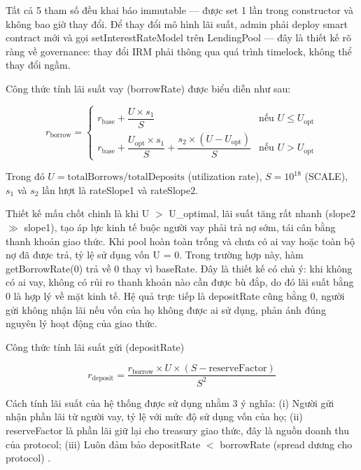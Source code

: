 \documentclass[../DoAn.tex]{subfiles}
\begin{document}
Tất cả 5 tham số đều khai báo immutable --- được set 1 lần trong constructor và không bao giờ thay đổi. Để thay đổi mô hình lãi suất, admin phải deploy smart contract mới và gọi setInterestRateModel trên LendingPool --- đây là thiết kế rõ ràng về governance: thay đổi IRM phải thông qua quá trình timelock, không thể thay đổi ngầm.

Công thức tính lãi suất vay (borrowRate) được biểu diễn như sau:

\begin{equation}
r_{\mathrm{borrow}} = \begin{cases}
r_{\mathrm{base}} + \dfrac{U \times s_1}{S} & \text{nếu } U \leq U_{\mathrm{opt}} \\[8pt]
r_{\mathrm{base}} + \dfrac{U_{\mathrm{opt}} \times s_1}{S} + \dfrac{s_2 \times (U - U_{\mathrm{opt}})}{S} & \text{nếu } U > U_{\mathrm{opt}}
\end{cases}
\label{eq:borrow_rate}
\end{equation}

Trong đó $U = \mathrm{totalBorrows} / \mathrm{totalDeposits}$ (utilization rate), $S = 10^{18}$ (SCALE), $s_1$ và $s_2$ lần lượt là rateSlope1 và rateSlope2.

Thiết kế mấu chốt chinh là khi U $>$ U\_optimal, lãi suất tăng rất nhanh (slope2 $\gg$ slope1), tạo áp lực kinh tế buộc người vay phải trả nợ sớm, tái cân bằng thanh khoản giao thức.
Khi pool hoàn toàn trống và chưa có ai vay hoặc toàn bộ nợ đã được trả, tỷ lệ sử dụng vốn U = 0. Trong trường hợp này, hàm getBorrowRate(0) trả về 0 thay vì baseRate. Đây là thiết kế có chủ ý: khi không có ai vay, không có rủi ro thanh khoản nào cần được bù đắp, do đó lãi suất bằng 0 là hợp lý về mặt kinh tế. Hệ quả trực tiếp là depositRate cũng bằng 0, người gửi không nhận lãi nếu vốn của họ không được ai sử dụng, phản ánh đúng nguyên lý hoạt động của giao thức.

Công thức tính lãi suất gửi (depositRate)

\begin{equation}
r_{\mathrm{deposit}} = \frac{r_{\mathrm{borrow}} \times U \times (S - \mathrm{reserveFactor})}{S^2}
\label{eq:deposit_rate}
\end{equation}

Cách tính lãi suất của hệ thống được sử dụng nhằm 3 ý nghĩa: (i) Người gửi nhận phần lãi từ người vay, tỷ lệ với mức độ sử dụng vốn của họ; (ii) reserveFactor là phần lãi giữ lại cho treasury giao thức, đây là nguồn doanh thu của protocol; (iii) Luôn đảm bảo depositRate $<$ borrowRate (spread dương cho protocol) .
\end{document}
